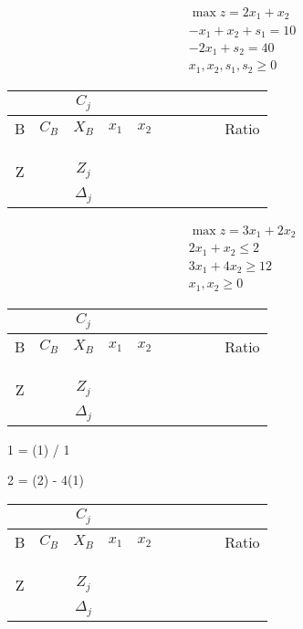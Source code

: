 \documentclass{exam}
\begin{document}
\begin{align*}
    & \max z = 2x_1 + x_2 \\
    & -x_1 + x_2  + s_1 = 10 \\
    & -2x_1 + s_2 = 40\\
    & x_1, x_2, s_1, s_2 \geq 0
\end{align*}

\begin{tabular}{cccccccccc}
    \toprule
        &  & $C_j$ &  &  &  &  &  &  &  \\
    \midrule
    B & $C_B$ & $X_B$ & $x_1$ & $x_2$ &  & & & & Ratio \\
    \midrule
        &  &  &  &  &  &  &  &  &  \\
        &  &  &  &  &  &  &  &  &  \\
        &  &  &  &  &  &  &  &  &  \\
    \midrule
    Z & & $Z_j$ &  & & &  &  &  & \\
    & & $\Delta_j$ &  & & &  &  &  & \\
    \bottomrule
\end{tabular}

\begin{align*}
    & \max z = 3x_1 + 2x_2 \\
    & 2x_1 + x_2  \leq 2 \\
    & 3x_1 + 4x_2 \geq 12 \\
    & x_1, x_2 \geq 0
\end{align*}

\begin{tabular}{cccccccccc}
    \toprule
        &  & $C_j$ &  &  &  &  &  &  &  \\
    \midrule
    B & $C_B$ & $X_B$ & $x_1$ & $x_2$ &  & & & & Ratio \\
    \midrule
        &  &  &  &  &  &  &  &  &  \\
        &  &  &  &  &  &  &  &  &  \\
        &  &  &  &  &  &  &  &  &  \\
    \midrule
    Z & & $Z_j$ &  & & &  &  &  & \\
    & & $\Delta_j$ &  & & &  &  &  & \\
    \bottomrule
\end{tabular}

1 = (1) / 1

2 = (2) - 4(1)


\begin{tabular}{cccccccccc}
    \toprule
        &  & $C_j$ &  &  &  &  &  &  &  \\
    \midrule
    B & $C_B$ & $X_B$ & $x_1$ & $x_2$ &  & & & & Ratio \\
    \midrule
        &  &  &  &  &  &  &  &  &  \\
        &  &  &  &  &  &  &  &  &  \\
        &  &  &  &  &  &  &  &  &  \\
    \midrule
    Z & & $Z_j$ &  & & &  &  &  & \\
    & & $\Delta_j$ &  & & &  &  &  & \\
    \bottomrule
\end{tabular}
\end{document}
